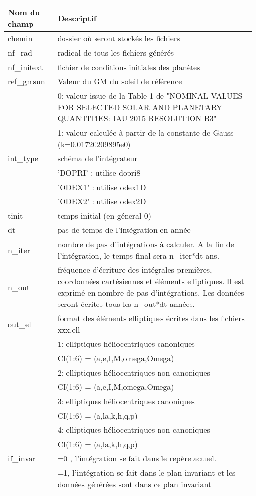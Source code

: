 \documentclass[11pt]{article}
\begin{document}
\begin{tabularx}{\textwidth}{|l|X|}
\hline
Nom du champ& Descriptif \\ \hline 
chemin   & dossier o\`u seront stock\'es les fichiers \\ \hline
 nf\_rad    & radical de tous les fichiers g\'en\'er\'es\\ \hline
 nf\_initext& fichier de conditions initiales des plan\`etes\\ \hline
 ref\_gmsun& Valeur du GM du soleil de r\'ef\'erence \\ 
& 0: valeur issue de la Table 1 de "NOMINAL VALUES FOR SELECTED SOLAR AND PLANETARY QUANTITIES: IAU 2015 RESOLUTION B3"\\
& 1: valeur calculée à partir de la constante de Gauss (k=0.01720209895e0) \\\hline


 int\_type& sch\'ema de l'int\'egrateur  \\
&'DOPRI' : utilise dopri8 \\
&'ODEX1' : utilise odex1D \\
&'ODEX2' : utilise odex2D \\
 \hline

 
 tinit & temps initial (en g\'eneral 0) \\ \hline

 dt& pas de temps de l'int\'egration en ann\'ee \\ \hline

 n\_iter& nombre de pas d'int\'egrations \`a calculer. A la fin de l'int\'egration, le temps final sera  n\_iter*dt ans.\\ \hline

 n\_out & fr\'equence d'\'ecriture des int\'egrales premi\`eres, coordonn\'ees cart\'esiennes et \'el\'ements elliptiques. Il est exprim\'e en nombre de pas d'int\'egrations. Les donn\'ees seront \'ecrites tous les n\_out*dt ann\'ees.
 \\ \hline
 out\_ell & format des \'el\'ements elliptiques \'ecrites dans les fichiers xxx.ell \\
&1:  elliptiques h\'eliocentriques canoniques\\
&	     CI(1:6) = (a,e,I,M,omega,Omega)\\
&2:  elliptiques h\'eliocentriques non canoniques\\
&	     CI(1:6) = (a,e,I,M,omega,Omega)\\
&3:  elliptiques h\'eliocentriques canoniques\\
&	     CI(1:6) = (a,la,k,h,q,p)\\
&4:  elliptiques h\'eliocentriques non canoniques\\
&	     CI(1:6) = (a,la,k,h,q,p)\\ \hline
 if\_invar & =0 , l'int\'egration se fait dans le rep\`ere actuel. \\
& =1, l'int\'egration se fait dans le plan invariant et les donn\'ees g\'en\'er\'ees sont dans ce plan invariant 
\\ \hline


\end{tabularx}
\end{document}
